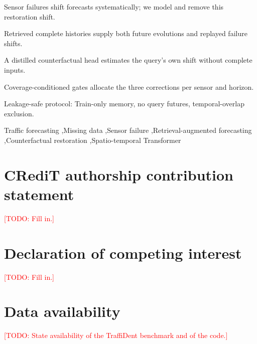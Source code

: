 \documentclass[preprint,12pt,authoryear]{elsarticle}
\newcommand{\todo}[1]{\textcolor{red}{[TODO: #1]}}
\begin{document}
\begin{frontmatter}
\begin{highlights}
\item Sensor failures shift forecasts systematically; we model and remove this restoration shift.
\item Retrieved complete histories supply both future evolutions and replayed failure shifts.
\item A distilled counterfactual head estimates the query's own shift without complete inputs.
\item Coverage-conditioned gates allocate the three corrections per sensor and horizon.
\item Leakage-safe protocol: Train-only memory, no query futures, temporal-overlap exclusion.
\end{highlights}

\begin{keyword}
Traffic forecasting \sep Missing data \sep Sensor failure \sep Retrieval-augmented forecasting \sep Counterfactual restoration \sep Spatio-temporal Transformer
\end{keyword}

\end{frontmatter}

\linenumbers










\section*{CRediT authorship contribution statement}
\todo{Fill in.}

\section*{Declaration of competing interest}
\todo{Fill in.}

\section*{Data availability}
\todo{State availability of the TraffiDent benchmark and of the code.}



\end{document}
